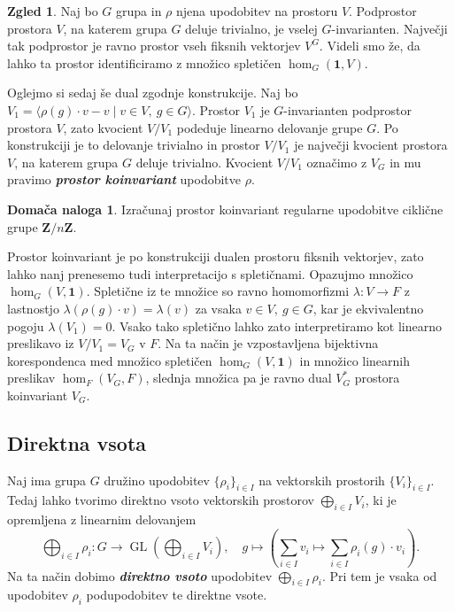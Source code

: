 \documentclass[11pt]{book}
\def\ZZ{\mathbf{Z}}
\def\11{\mathbf{1}}
\DeclareMathOperator\GL{GL}
\def\definicija{\color{rdeca}\bf\em}
\theoremstyle{definition}
\theoremstyle{zgled}
\newtheorem*{zgled}{Zgled}
\theoremstyle{odprtproblem}
\theoremstyle{domacanaloga}
\newtheorem*{domacanaloga}{Domača naloga}
\theoremstyle{izrek}
\begin{document}
\begin{zgled}
Naj bo $G$ grupa in $\rho$ njena upodobitev na prostoru $V$. Podprostor prostora $V$, na katerem grupa $G$ deluje trivialno, je vselej $G$-invarianten. Največji tak podprostor je ravno prostor vseh fiksnih vektorjev $V^G$. Videli smo že, da lahko ta prostor identificiramo z množico spletičen $\hom_G(\11, V)$.
    
Oglejmo si sedaj še dual zgodnje konstrukcije. Naj bo $V_1 = \langle \rho(g) \cdot v - v \mid v \in V, \ g \in G \rangle$. Prostor $V_1$ je $G$-invarianten podprostor prostora $V$, zato kvocient $V/V_1$ podeduje linearno delovanje grupe $G$. Po konstrukciji je to delovanje trivialno in prostor $V/V_1$ je največji kvocient prostora $V$, na katerem grupa $G$ deluje trivialno. Kvocient $V/V_1$ označimo z $V_G$ in mu pravimo {\definicija prostor koinvariant} upodobitve $\rho$.

\begin{domacanaloga}
    Izračunaj prostor koinvariant regularne upodobitve ciklične grupe $\ZZ/n\ZZ$.
\end{domacanaloga}

Prostor koinvariant je po konstrukciji dualen prostoru fiksnih vektorjev, zato lahko nanj prenesemo tudi interpretacijo s spletičnami. Opazujmo množico $\hom_G(V, \11)$. Spletične iz te množice so ravno homomorfizmi $\lambda \colon V \to F$ z lastnostjo $\lambda(\rho(g) \cdot v) = \lambda(v)$ za vsaka $v \in V, \ g \in G$, kar je ekvivalentno pogoju $\lambda(V_1) = 0$. Vsako tako spletično lahko zato interpretiramo kot linearno preslikavo iz $V/V_1 = V_G$ v $F$. Na ta način je vzpostavljena bijektivna korespondenca med množico spletičen $\hom_G(V,\11)$ in množico linearnih preslikav $\hom_F(V_G, F)$, slednja množica pa je ravno dual $V_G^*$ prostora koinvariant $V_G$.
\end{zgled}

\subsection{Direktna vsota}

Naj ima grupa $G$ družino upodobitev $\{ \rho_i \}_{i \in I}$ na vektorskih prostorih $\{ V_i \}_{i \in I}$. Tedaj lahko tvorimo direktno vsoto vektorskih prostorov $\bigoplus_{i \in I} V_i$, ki je opremljena z linearnim delovanjem
\[
  \bigoplus_{i \in I} \rho_i \colon G \to \GL(\bigoplus_{i \in I} V_i), \quad
  g \mapsto \left( \sum_{i \in I} v_i \mapsto \sum_{i \in I} \rho_i(g) \cdot v_i \right).
\]
Na ta način dobimo {\definicija direktno vsoto} upodobitev $\bigoplus_{i \in I} \rho_i$. Pri tem je vsaka od upodobitev $\rho_i$ podupodobitev te direktne vsote.
\end{document}

